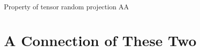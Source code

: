 \documentclass[handout,xcolor={usenames,dvipsnames}]{beamer}
\begin{document}
\begin{frame}{Property of tensor random projection}
AA
\end{frame}

\section{A Connection of These Two}





\end{document}
